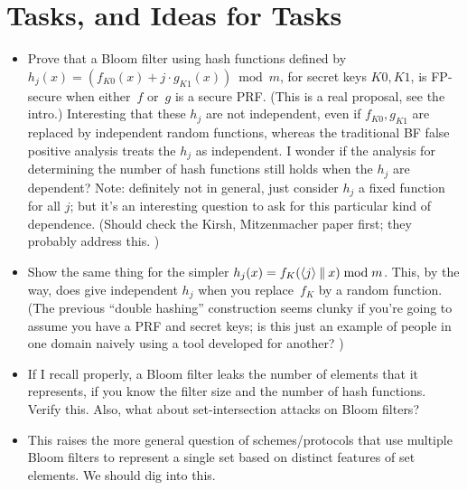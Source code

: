 \section{Tasks, and Ideas for Tasks}

\begin{itemize}
\item Prove that a Bloom filter using hash functions defined by
    $h_j(x) = \left( f_{K0}(x) + j\cdot g_{K1}(x)\right) \bmod
    m$, for secret keys $K0,K1$, is FP-secure when either~$f$
    or~$g$ is a secure PRF.  (This is a real proposal, see the
    intro.)  Interesting that these $h_j$ are not independent,
    even if $f_{K0},g_{K1}$ are replaced by independent random
    functions, whereas the traditional BF false positive
    analysis treats the $h_j$ as independent.  I wonder if the
    analysis for determining the number of hash functions still
    holds when the $h_j$ are dependent?  Note: definitely not in
    general, just consider $h_j$ a fixed function for all $j$;
    but it's an interesting question to ask for this particular
    kind of dependence.  (Should check the Kirsh, Mitzenmacher
    paper first; they probably address this. )

\item Show the same thing for the simpler $h_j(x) =
    f_{K}(\langle j \rangle \: \| \: x) \bmod m$.  This, by the
    way, does give independent $h_j$ when you replace~$f_K$ by a
    random function.  (The previous ``double hashing''
    construction seems clunky if you're going to assume you have
    a PRF and secret keys; is this just an example of people in
    one domain naively using a tool developed for another? )

\item  If I recall properly, a Bloom filter leaks the number of elements that it represents, if you know the filter size and the number of hash functions.  Verify this.    Also, what about set-intersection attacks on Bloom filters?
\item This raises the more general question of schemes/protocols that use multiple Bloom filters to represent a single set based on distinct features of set elements.  We should dig into this.


\end{itemize}
